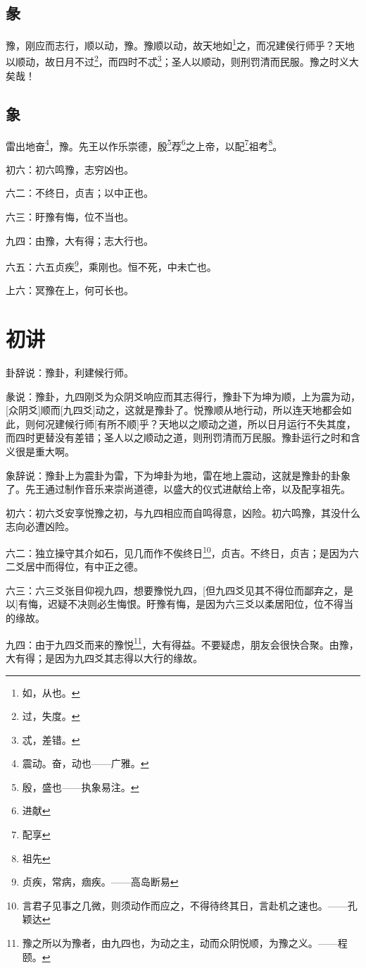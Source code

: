 \documentclass[12pt,oneside]{book}
\begin{document}
\subsection{彖}
豫，刚应而志行，顺以动，豫。豫顺以动，故天地如\footnote{如，从也。}之，而况建侯行师乎？天地以顺动，故日月不过\footnote{过，失度。}，而四时不忒\footnote{忒，差错。}；圣人以顺动，则刑罚清而民服。豫之时义大矣哉！

\subsection{象}
雷出地奋\footnote{震动。奋，动也——广雅。}，豫。先王以作乐崇德，殷\footnote{殷，盛也——执象易注。}荐\footnote{进献}之上帝，以配\footnote{配享}祖考\footnote{祖先}。

初六：初六鸣豫，志穷凶也。

六二：不终日，贞吉；以中正也。

六三：盱豫有悔，位不当也。

九四：由豫，大有得；志大行也。

六五：六五贞疾\footnote{贞疾，常病，痼疾。——高岛断易}，乘刚也。恒不死，中未亡也。

上六：冥豫在上，何可长也。

\section{初讲}
卦辞说：豫卦，利建候行师。

彖说：豫卦，九四刚爻为众阴爻响应而其志得行，豫卦下为坤为顺，上为震为动，[众阴爻]顺而[九四爻]动之，这就是豫卦了。悦豫顺从地行动，所以连天地都会如此，则何况建候行师[有所不顺]乎？天地以之顺动之道，所以日月运行不失其度，而四时更替没有差错；圣人以之顺动之道，则刑罚清而万民服。豫卦运行之时和含义很是重大啊。

象辞说：豫卦上为震卦为雷，下为坤卦为地，雷在地上震动，这就是豫卦的卦象了。先王通过制作音乐来崇尚道德，以盛大的仪式进献给上帝，以及配享祖先。

初六：初六爻安享悦豫之初，与九四相应而自鸣得意，凶险。初六鸣豫，其没什么志向必遭凶险。

六二：独立操守其介如石，见几而作不俟终日\footnote{言君子见事之几微，则须动作而应之，不得待终其日，言赴机之速也。——孔颖达}，贞吉。不终日，贞吉；是因为六二爻居中而得位，有中正之德。

六三：六三爻张目仰视九四，想要豫悦九四，[但九四爻见其不得位而鄙弃之，是以]有悔，迟疑不决则必生悔恨。盱豫有悔，是因为六三爻以柔居阳位，位不得当的缘故。

九四：由于九四爻而来的豫悦\footnote{豫之所以为豫者，由九四也，为动之主，动而众阴悦顺，为豫之义。——程颐。}，大有得益。不要疑虑，朋友会很快合聚。由豫，大有得；是因为九四爻其志得以大行的缘故。
\end{document}

